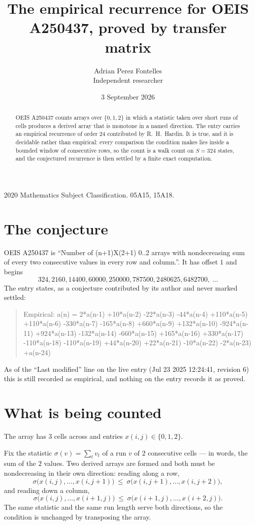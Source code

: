 \documentclass[11pt,a4paper]{article}
\title{The empirical recurrence for OEIS A250437, proved by transfer matrix}
\author{Adrian Perez Fontelles\\ \small Independent researcher}
\date{3 September 2026}
\theoremstyle{plain}
\theoremstyle{definition}
\begin{document}
\maketitle

\begin{abstract}
OEIS A250437 counts arrays over $\{0,1,2\}$ in which a statistic taken over short runs
of cells produces a derived array that is monotone in a named direction. The entry carries an
empirical recurrence of order $24$ contributed by R.~H.~Hardin. It is true, and it is
decidable rather than empirical: every comparison the condition makes lies inside a bounded
window of consecutive rows, so the count is a walk count on $S=324$ states, and the
conjectured recurrence is then settled by a finite exact computation.
\end{abstract}

\noindent\small 2020 Mathematics Subject Classification. 05A15, 15A18.\normalsize

\section{The conjecture}

OEIS A250437 is ``Number of (n+1)X(2+1) 0..2 arrays with nondecreasing sum of every two consecutive values in every row and column.''. It has offset $1$ and begins
\[
324, 2160, 14400, 60000, 250000, 787500, 2480625, 6482700,\ \dots
\]
The entry states, as a conjecture contributed by its author and never marked settled:
\begin{quote}
Empirical: a(n) = 2*a(n-1) +10*a(n-2) -22*a(n-3) -44*a(n-4) +110*a(n-5) +110*a(n-6) -330*a(n-7) -165*a(n-8) +660*a(n-9) +132*a(n-10) -924*a(n-11) +924*a(n-13) -132*a(n-14) -660*a(n-15) +165*a(n-16) +330*a(n-17) -110*a(n-18) -110*a(n-19) +44*a(n-20) +22*a(n-21) -10*a(n-22) -2*a(n-23) +a(n-24)
\end{quote}
As of the ``Last modified'' line on the live entry (Jul 23 2025 12:24:41, revision 6) this is still
recorded as empirical, and nothing on the entry records it as proved.

\section{What is being counted}

The array has $3$ cells across and entries $x(i,j)\in\{0,1,2\}$.

Fix the statistic $\sigma(v)=\sum_{t} v_t$ of a run $v$ of $2$ consecutive cells --- in words,
the sum of the $2$ values. Two derived arrays are formed and both must be
nondecreasing in their own direction: reading along a row,
\[
\sigma\bigl(x(i,j),\dots,x(i,j{+}1)\bigr)\ \le\
\sigma\bigl(x(i,j{+}1),\dots,x(i,j{+}2)\bigr),
\]
and reading down a column,
\[
\sigma\bigl(x(i,j),\dots,x(i{+}1,j)\bigr)\ \le\
\sigma\bigl(x(i{+}1,j),\dots,x(i{+}2,j)\bigr).
\]
The same statistic and the same run length serve both directions, so the condition is
unchanged by transposing the array.
\end{document}
